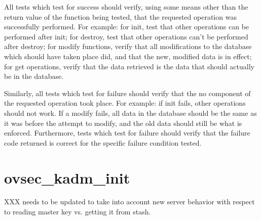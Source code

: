 All tests which test for success should verify, using some means other
than the return value of the function being tested, that the requested
operation was successfully performed.  For example: for init, test
that other operations can be performed after init; for destroy, test
that other operations can't be performed after destroy; for modify
functions, verify that all modifications to the database which should
have taken place did, and that the new, modified data is in effect;
for get operations, verify that the data retrieved is the data that
should actually be in the database.

Similarly, all tests which test for failure should verify that the
no component of the requested operation took place.  For example: if
init fails, other operations should not work.  If a modify fails, all
data in the database should be the same as it was before the attempt
to modify, and the old data should still be what is enforced.
Furthermore, tests which test for failure should verify that the
failure code returned is correct for the specific failure condition
tested.

\section{ovsec_kadm_init}


XXX needs to be updated to take into account new server behavior with
respect to reading master key vs. getting it from stash.






